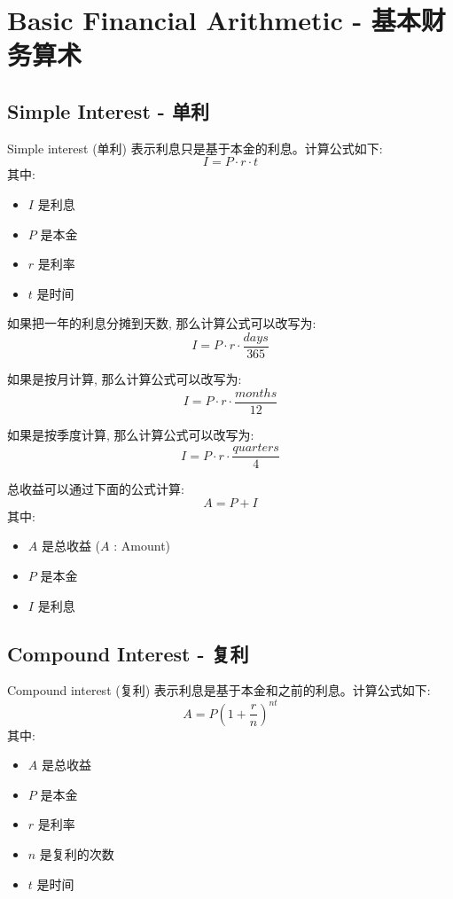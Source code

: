 \section{Basic Financial Arithmetic - 基本财务算术}
\subsection{Simple Interest - 单利}
Simple interest (单利) 表示利息只是基于本金的利息。计算公式如下: 
\begin{equation}
    I = P \cdot r \cdot t
\end{equation}
其中: 
\begin{itemize}
    \item $I$ 是利息
    \item $P$ 是本金
    \item $r$ 是利率
    \item $t$ 是时间
\end{itemize}

如果把一年的利息分摊到天数, 那么计算公式可以改写为: 
\begin{equation}
    I = P \cdot r \cdot \frac{days}{365}
\end{equation}

如果是按月计算, 那么计算公式可以改写为: 
\begin{equation}
    I = P \cdot r \cdot \frac{months}{12}
\end{equation}

如果是按季度计算, 那么计算公式可以改写为: 
\begin{equation}
    I = P \cdot r \cdot \frac{quarters}{4}
\end{equation}

总收益可以通过下面的公式计算: 
\begin{equation}
    A = P + I
\end{equation}
其中: 
\begin{itemize}
    \item $A$ 是总收益 ($A$ : Amount)
    \item $P$ 是本金
    \item $I$ 是利息
\end{itemize}


\subsection{Compound Interest - 复利}
Compound interest (复利) 表示利息是基于本金和之前的利息。计算公式如下: 
\begin{equation}
    A = P \left(1 + \frac{r}{n}\right)^{nt}
\end{equation}
其中: 
\begin{itemize}
    \item $A$ 是总收益
    \item $P$ 是本金
    \item $r$ 是利率
    \item $n$ 是复利的次数
    \item $t$ 是时间
\end{itemize}

